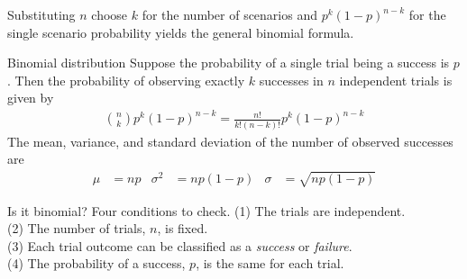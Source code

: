 Substituting $n$ choose $k$ for the number of scenarios
and $p^k(1-p)^{n-k}$ for the single scenario probability
yields the general binomial formula.

\begin{onebox}{Binomial distribution}
  Suppose the probability of a single trial being
  a success is $p$.
  Then the probability of observing exactly $k$ successes
  in $n$ independent trials is given by\vspace{-1mm}
  \begin{align*}
  {n\choose k}p^k(1-p)^{n-k} = \frac{n!}{k!(n-k)!}p^k(1-p)^{n-k}
  \end{align*}
  The mean, variance, and standard deviation
  of the number of observed successes are\vspace{-2mm}
  \begin{align*}
  \mu &= np
  &\sigma^2 &= np(1-p)
  &\sigma&= \sqrt{np(1-p)}
  \end{align*}
\end{onebox}

\begin{onebox}{Is it binomial? Four conditions to check.}
  \label{isItBinomialTipBox}%
  (1) The trials are independent. \\
  (2) The number of trials, $n$, is fixed. \\
  (3) Each trial outcome can be classified as a \emph{success}
      or \emph{failure}. \\
  (4) The probability of a success, $p$, is the same for
      each trial.
\end{onebox}

